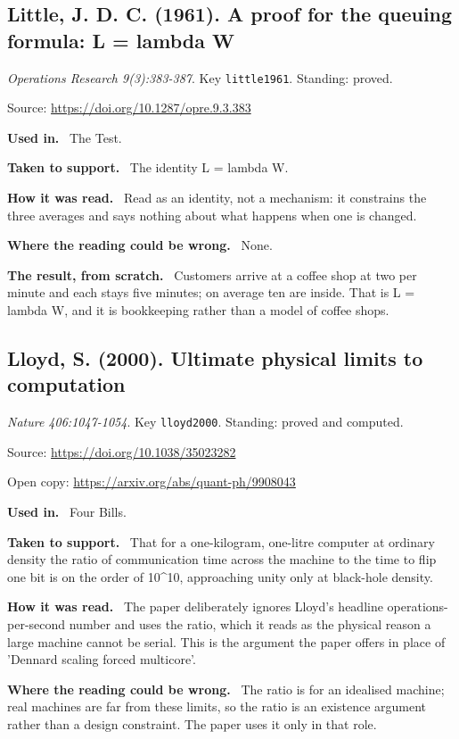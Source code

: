 \documentclass[11pt,oneside]{article}
\newcommand{\field}[1]{\par\noindent\textbf{\color{accent}#1.}\ }
\begin{document}
\hypertarget{src:little1961}{}
\subsection*{Little, J. D. C. (1961). A proof for the queuing formula: L = lambda W}
\noindent\small\emph{Operations Research 9(3):383-387}. Key \texttt{little1961}. Standing: proved.
\par\noindent\small Source: \url{https://doi.org/10.1287/opre.9.3.383}
\normalsize
\field{Used in} The Test.
\field{Taken to support} The identity L = lambda W.
\field{How it was read} Read as an identity, not a mechanism: it constrains the three averages and says nothing about what happens when one is changed.
\field{Where the reading could be wrong} None.
\field{The result, from scratch} Customers arrive at a coffee shop at two per minute and each stays five minutes; on average ten are inside. That is L = lambda W, and it is bookkeeping rather than a model of coffee shops.

\hypertarget{src:lloyd2000}{}
\subsection*{Lloyd, S. (2000). Ultimate physical limits to computation}
\noindent\small\emph{Nature 406:1047-1054}. Key \texttt{lloyd2000}. Standing: proved and computed.
\par\noindent\small Source: \url{https://doi.org/10.1038/35023282}
\par\noindent\small Open copy: \url{https://arxiv.org/abs/quant-ph/9908043}
\normalsize
\field{Used in} Four Bills.
\field{Taken to support} That for a one-kilogram, one-litre computer at ordinary density the ratio of communication time across the machine to the time to flip one bit is on the order of 10\textasciicircum{}10, approaching unity only at black-hole density.
\field{How it was read} The paper deliberately ignores Lloyd's headline operations-per-second number and uses the ratio, which it reads as the physical reason a large machine cannot be serial. This is the argument the paper offers in place of 'Dennard scaling forced multicore'.
\field{Where the reading could be wrong} The ratio is for an idealised machine; real machines are far from these limits, so the ratio is an existence argument rather than a design constraint. The paper uses it only in that role.

\hypertarget{src:margolus1998}{}
\end{document}

